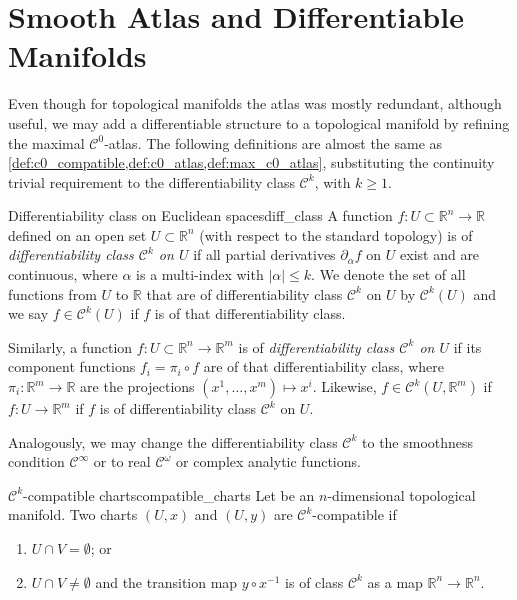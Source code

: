 \section{Smooth Atlas and Differentiable Manifolds}

Even though for topological manifolds the atlas was mostly redundant, although useful, we may add a differentiable structure to a topological manifold by refining the maximal \(\mathcal{C}^0\)-atlas. The following definitions are almost the same as \cref{def:c0_compatible,def:c0_atlas,def:max_c0_atlas}, substituting the continuity trivial requirement to the differentiability class \(\mathcal{C}^k\), with \(k \geq 1\).
\begin{definition}{Differentiability class on Euclidean spaces}{diff_class}
    A function \(f : U \subset \mathbb{R}^n \to \mathbb{R}\) defined on an open set \(U\subset \mathbb{R}^n\) (with respect to the standard topology) is of \emph{differentiability class \(\mathcal{C}^k\) on \(U\)} if all partial derivatives \(\partial_\alpha f\) on \(U\) exist and are continuous, where \(\alpha\) is a multi-index with \(|\alpha| \leq k\). We denote the set of all functions from \(U\) to \(\mathbb{R}\) that are of differentiability class \(\mathcal{C}^k\) on \(U\) by \(\mathcal{C}^k(U)\) and we say \(f \in \mathcal{C}^k(U)\) if \(f\) is of that differentiability class.

    Similarly, a function \(f : U \subset \mathbb{R}^n \to \mathbb{R}^m\) is of \emph{differentiability class \(\mathcal{C}^k\) on \(U\)} if its component functions \(f_i = \pi_i \circ f\) are of that differentiability class, where \(\pi_i : \mathbb{R}^m \to \mathbb{R}\) are the projections \((x^1, \dots, x^m) \mapsto x^i\). Likewise, \(f \in \mathcal{C}^k(U, \mathbb{R}^m)\) if \(f : U \to \mathbb{R}^m\) if \(f\) is of differentiability class \(\mathcal{C}^k\) on \(U\).
\end{definition}
Analogously, we may change the differentiability class \(\mathcal{C}^k\) to the smoothness condition \(\mathcal{C}^\infty\) or to real \(\mathcal{C}^\omega\) or complex analytic functions.

\begin{definition}{\(\mathcal{C}^k\)-compatible charts}{compatible_charts}
    Let  be an \(n\)-dimensional topological manifold. Two charts \((U, x)\) and \((U, y)\) are \(\mathcal{C}^k\)-compatible if
    \begin{enumerate}[label=(\alph*)]
        \item \(U \cap V = \emptyset\); or
        \item \(U \cap V \neq \emptyset\) and the transition map \(y \circ x^{-1}\) is of class \(\mathcal{C}^k\) as a map \(\mathbb{R}^n \to \mathbb{R}^n\).
    \end{enumerate}
\end{definition}

